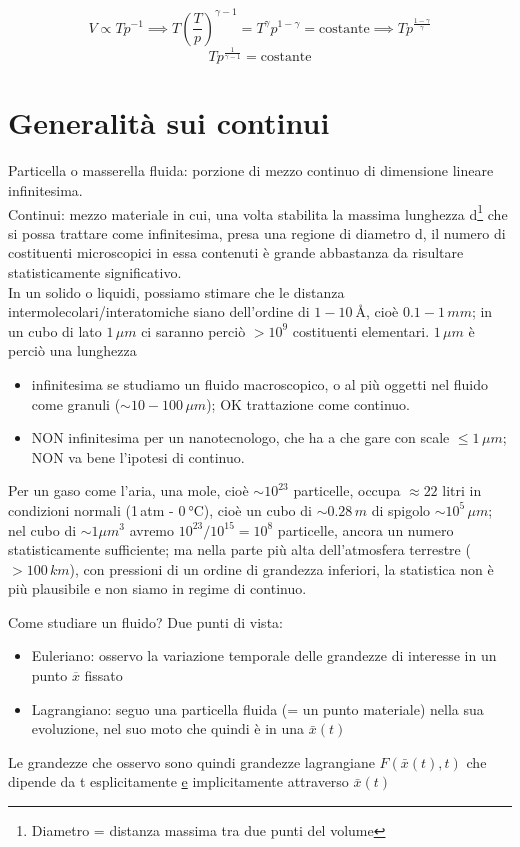 \documentclass[a4paper,11pt]{report}
\newcommand{\x}{\bar{x}}
\begin{document}
		$$
		V\propto Tp^{-1} \implies T\left(\dfrac{T}{p}\right)^{\gamma-1} = T^{\gamma}p^{1-\gamma} = \textrm{costante} \implies Tp^{\frac{1-\gamma}{\gamma}}
		$$
		\begin{equation}
		Tp^{\frac{1}{\gamma -1}} = \mathrm{costante}
		\end{equation}
		
	
	

\chapter{Generalità sui continui}
		Particella o masserella fluida: porzione di mezzo continuo di dimensione lineare infinitesima.\\
		Continui: mezzo materiale in cui, una volta stabilita la massima lunghezza d\footnote{Diametro = distanza massima tra due punti del volume} che si possa trattare come infinitesima, presa una regione di diametro d, il numero di costituenti microscopici in essa contenuti è grande abbastanza da risultare statisticamente significativo.\\
		
		In un solido o liquidi, possiamo stimare che le distanza intermolecolari/interatomiche siano dell'ordine di $1-\SI{10}{\angstrom}$, cioè $0.1-1\,mm$; in un cubo di lato $1\,\mu m$ ci saranno perciò $>10^9$ costituenti elementari. 
		$1\,\mu m$ è perciò una lunghezza
		\begin{itemize}
			\item infinitesima se studiamo un fluido macroscopico, o al più oggetti nel fluido come granuli ($\sim 10-100\,\mu m$); OK trattazione come continuo.
			\item NON infinitesima per un nanotecnologo, che ha a che gare con scale $\leq 1\,\mu m$; NON va bene l'ipotesi di continuo.
		\end{itemize}
		
		Per un gaso come l'aria, una mole, cioè $\sim 10^{23}$ particelle, occupa $\approx 22$ litri in condizioni normali (1\,atm - $\SI{0}{\celsius}$), cioè un cubo di $\sim 0.28\,m$ di spigolo $\sim 10^5\,\mu m$; nel cubo di $\sim 1\mu m^3$ avremo $10^{23}/10^{15} = 10^8$ particelle, ancora un numero statisticamente sufficiente;
		ma nella parte più alta dell'atmosfera terrestre ($>100\,km$), con pressioni di un ordine di grandezza inferiori, la statistica non è più plausibile e non siamo in regime di continuo.
		
		Come studiare un fluido? Due punti di vista:
		\begin{itemize}
			\item Euleriano: osservo la variazione temporale delle grandezze di interesse in un punto $\overline{x}$ fissato
			
			\item Lagrangiano: seguo una particella fluida (= un punto materiale) nella sua evoluzione, nel suo moto che quindi è in una $\x(t)$
		\end{itemize}
		Le grandezze che osservo sono quindi grandezze lagrangiane $F(\x(t),t)$ che dipende da t esplicitamente \underline{e} implicitamente attraverso $\x(t)$
		
\end{document}
